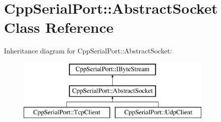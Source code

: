 \hypertarget{class_cpp_serial_port_1_1_abstract_socket}{}\section{Cpp\+Serial\+Port\+:\+:Abstract\+Socket Class Reference}
\label{class_cpp_serial_port_1_1_abstract_socket}
Inheritance diagram for Cpp\+Serial\+Port\+:\+:Abstract\+Socket\+:\begin{figure}[H]
\begin{center}
\leavevmode
\includegraphics[height=3.000000cm]{class_cpp_serial_port_1_1_abstract_socket}
\end{center}
\end{figure}
